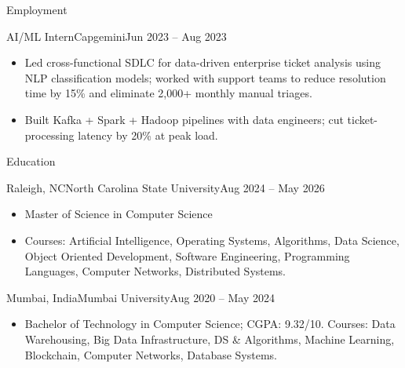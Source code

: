 \documentclass[]{mcdowellcv}
\begin{document}
\begin{cvsection}{Employment}
  \begin{cvsubsection}{AI/ML Intern}{Capgemini}{Jun 2023 -- Aug 2023}
    \begin{itemize}
      \item Led cross-functional SDLC for data-driven enterprise ticket analysis using NLP classification models; worked with support teams to reduce resolution time by 15\% and eliminate 2,000+ monthly manual triages.
      \item Built Kafka + Spark + Hadoop pipelines with data engineers; cut ticket-processing latency by 20\% at peak load.
    \end{itemize}
    \vspace{-1.5pt}
  \end{cvsubsection}
\end{cvsection}

\begin{cvsection}{Education}
  \begin{cvsubsection}{Raleigh, NC}{North Carolina State University}{Aug 2024 -- May 2026}
    \begin{itemize}
      \item Master of Science in Computer Science
      \item Courses: Artificial Intelligence, Operating Systems, Algorithms, Data Science, Object Oriented Development, Software Engineering, Programming Languages, Computer Networks, Distributed Systems.
    \end{itemize}
    \vspace{-1.5pt}
  \end{cvsubsection}

  \begin{cvsubsection}{Mumbai, India}{Mumbai University}{Aug 2020 -- May 2024}
    \begin{itemize}
      \item Bachelor of Technology in Computer Science; CGPA: 9.32/10. Courses: Data Warehousing, Big Data Infrastructure, DS \& Algorithms, Machine Learning, Blockchain, Computer Networks, Database Systems.
    \end{itemize}
    \vspace{-1.5pt}
  \end{cvsubsection}
\end{cvsection}
\end{document}
